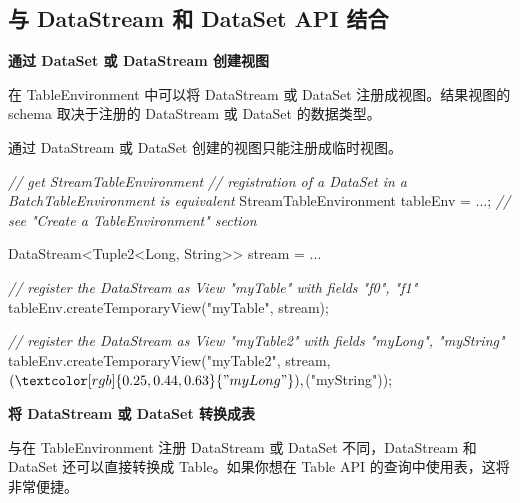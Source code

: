 \documentclass[cn,11pt,chinese]{elegantbook}
\newenvironment{Shaded}{}{}
\newcommand{\BuiltInTok}[1]{#1}
\newcommand{\CommentTok}[1]{\textcolor[rgb]{0.38,0.63,0.69}{\textit{#1}}}
\newcommand{\FunctionTok}[1]{\textcolor[rgb]{0.02,0.16,0.49}{#1}}
\newcommand{\NormalTok}[1]{#1}
\newcommand{\StringTok}[1]{\textcolor[rgb]{0.25,0.44,0.63}{#1}}
\renewenvironment{quote}{\begin{customblockquote}\list{}{\rightmargin=0em\leftmargin=0em}%
\item\relax\color{blockquote-text}\ignorespaces}{\unskip\unskip\endlist\end{customblockquote}}
\begin{document}
\hypertarget{ux4e0e-datastream-ux548c-dataset-api-ux7ed3ux5408}{%
\subsection{与 DataStream 和 DataSet API
结合}\label{ux4e0e-datastream-ux548c-dataset-api-ux7ed3ux5408}}

\textbf{通过 DataSet 或 DataStream 创建视图}

在 TableEnvironment 中可以将 DataStream 或 DataSet
注册成视图。结果视图的 schema 取决于注册的 DataStream 或 DataSet
的数据类型。

\begin{quote}
通过 DataStream 或 DataSet 创建的视图只能注册成临时视图。
\end{quote}

\begin{Shaded}
\begin{Highlighting}[]
\CommentTok{// get StreamTableEnvironment}
\CommentTok{// registration of a DataSet in a BatchTableEnvironment is equivalent}
\NormalTok{StreamTableEnvironment tableEnv = ...; }\CommentTok{// see "Create a TableEnvironment" section}

\NormalTok{DataStream\textless{}Tuple2\textless{}}\BuiltInTok{Long}\NormalTok{, }\BuiltInTok{String}\NormalTok{\textgreater{}\textgreater{} stream = ...}

\CommentTok{// register the DataStream as View "myTable" with fields "f0", "f1"}
\NormalTok{tableEnv.}\FunctionTok{createTemporaryView}\NormalTok{(}\StringTok{"myTable"}\NormalTok{, stream);}

\CommentTok{// register the DataStream as View "myTable2" with fields "myLong", "myString"}
\NormalTok{tableEnv.}\FunctionTok{createTemporaryView}\NormalTok{(}\StringTok{"myTable2"}\NormalTok{, stream, $(}\StringTok{"myLong"}\NormalTok{), $(}\StringTok{"myString"}\NormalTok{));}
\end{Highlighting}
\end{Shaded}

\textbf{将 DataStream 或 DataSet 转换成表}

与在 TableEnvironment 注册 DataStream 或 DataSet 不同，DataStream 和
DataSet 还可以直接转换成 Table。如果你想在 Table API
的查询中使用表，这将非常便捷。
\end{document}
